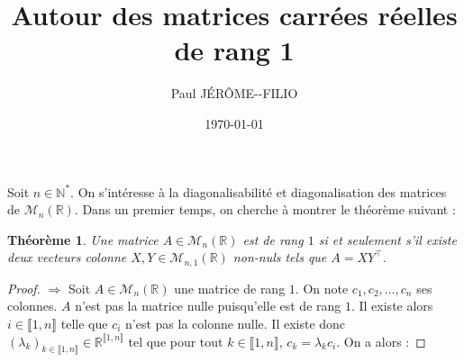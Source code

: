 \documentclass[a4paper]{article}
\title{Autour des matrices carrées réelles de rang 1}
\date{\today}
\author{Paul JÉRÔME-\--FILIO}
\newtheorem*{theorem}{Théorème}
\begin{document}
\maketitle
\allowdisplaybreaks

Soit $n \in \mathbb{N}^*$. On s'intéresse à la diagonalisabilité et diagonalisation des matrices de $\mathcal{M}_{n}(\mathbb{R})$. Dans un premier temps, on cherche à montrer le théorème suivant :

\begin{theorem}
    Une matrice $A \in \mathcal{M}_{n}(\mathbb{R})$ est de rang $1$ si et seulement s'il existe deux vecteurs colonne $X, Y \in \mathcal{M}_{n, 1}(\mathbb{R})$ non-nuls tels que $A = XY^\top$.
\end{theorem}

\begin{proof}
    $\boxed{\Rightarrow}$ Soit $A \in \mathcal{M}_{n}(\mathbb{R})$ une matrice de rang $1$. On note $c_1, c_2, \dots, c_n$ ses colonnes. $A$ n'est pas la matrice nulle puisqu'elle est de rang $1$. Il existe alors $i \in \llbracket 1, n \rrbracket$ telle que $c_i$ n'est pas la colonne nulle. Il existe donc $\left(\lambda_k\right)_{k \in \llbracket 1, n \rrbracket} \in \mathbb{R}^{\llbracket 1, n \rrbracket}$ tel que pour tout $k \in \llbracket 1, n \rrbracket$, $c_k = \lambda_k c_i$. On a alors :
    

\end{proof}
\end{document}
